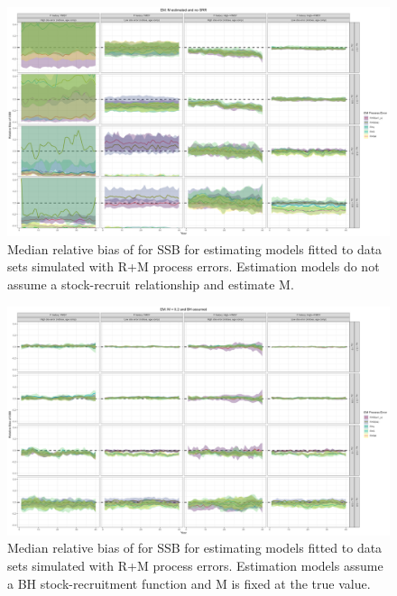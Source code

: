 \documentclass[
  12pt,
]{article}
\begin{document}
\begin{landscape}
\begin{figure}
\caption{Median relative bias of for SSB for estimating models fitted to data sets simulated with R+M process errors. Estimation models do not assume a stock-recruit relationship and estimate M.}\label{M_om_em_R_ME_relbias_ssb}
\begin{center}
\includegraphics[width = \textwidth]{M_om_R_ME_relbias_ssb.png}
\end{center}
\end{figure}
\end{landscape}

\begin{landscape}
\begin{figure}
\caption{Median relative bias of for SSB for estimating models fitted to data sets simulated with R+M process errors. Estimation models assume a BH stock-recruitment function and M is fixed at the true value.}\label{M_om_em_BH_MF_relbias_ssb}
\begin{center}
\includegraphics[width = \textwidth]{M_om_BH_MF_relbias_ssb.png}
\end{center}
\end{figure}
\end{landscape}
\end{document}
